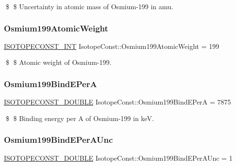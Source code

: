 \$ \$ Uncertainty in atomic mass of Osmium-\/199 in amu. \mbox{\label{group___isotope_const-_osmium-_os199_ga4545f35ab0c4f1dfa26cfdfd4f7ca408}} 
\subsubsection{\texorpdfstring{Osmium199\+Atomic\+Weight}{Osmium199AtomicWeight}}
{\footnotesize\ttfamily \mbox{\hyperlink{group___isotope_const-_macros_ga5f18360b3e99483a35c32d789e62621c}{I\+S\+O\+T\+O\+P\+E\+C\+O\+N\+S\+T\+\_\+\+I\+NT}} Isotope\+Const\+::\+Osmium199\+Atomic\+Weight = 199}

\$ \$ Atomic weight of Osmium-\/199. \mbox{\label{group___isotope_const-_osmium-_os199_gad5027a6e74c41cbcc663877b5fd42362}} 
\subsubsection{\texorpdfstring{Osmium199\+Bind\+E\+PerA}{Osmium199BindEPerA}}
{\footnotesize\ttfamily \mbox{\hyperlink{group___isotope_const-_macros_ga8f45a7272ce02c0b4c65c44636ed719a}{I\+S\+O\+T\+O\+P\+E\+C\+O\+N\+S\+T\+\_\+\+D\+O\+U\+B\+LE}} Isotope\+Const\+::\+Osmium199\+Bind\+E\+PerA = 7875}

\$ \$ Binding energy per A of Osmium-\/199 in keV. \mbox{\label{group___isotope_const-_osmium-_os199_ga5bfb28ab241556bfdfde14dcb378b539}} 
\subsubsection{\texorpdfstring{Osmium199\+Bind\+E\+Per\+A\+Unc}{Osmium199BindEPerAUnc}}
{\footnotesize\ttfamily \mbox{\hyperlink{group___isotope_const-_macros_ga8f45a7272ce02c0b4c65c44636ed719a}{I\+S\+O\+T\+O\+P\+E\+C\+O\+N\+S\+T\+\_\+\+D\+O\+U\+B\+LE}} Isotope\+Const\+::\+Osmium199\+Bind\+E\+Per\+A\+Unc = 1}


